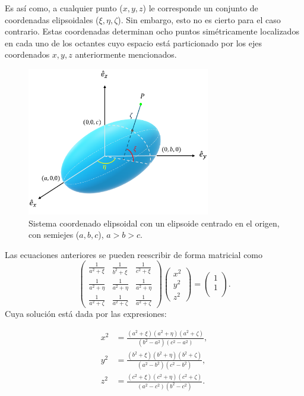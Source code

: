 \noindent Es así como, a cualquier punto ($x,y,z$) le corresponde un conjunto de coordenadas elipsoidales ($\xi,\eta,\zeta$). Sin embargo, esto no es cierto para el caso contrario. Estas coordenadas determinan ocho puntos simétricamente localizados en cada uno de los octantes cuyo espacio está particionado por los ejes coordenados $x,y,z$ anteriormente mencionados.\\
\begin{figure}[H]
    \centering
    \includegraphics[width=8cm]{../../Figuras/elipticalcoordinates}    
    \caption{Sistema coordenado elipsoidal con un elipsoide centrado en el origen, con semiejes ($a, b, c$), $a > b > c.$}
    \label{elipse}
\end{figure}
\noindent Las ecuaciones anteriores se pueden reescribir de forma matricial como
\begin{equation*}
    \begin{pmatrix}
    \frac{1}{a^2+\xi} & \frac{1}{b^2+\xi} & \frac{1}{c^2+\xi}\\
    \frac{1}{a^2+\eta} & \frac{1}{a^2+\eta} & \frac{1}{a^2+\eta}\\
    \frac{1}{a^2+\zeta} & \frac{1}{a^2+\zeta} & \frac{1}{a^2+\zeta}\end{pmatrix}\begin{pmatrix}
        x^2\\
        y^2\\
        z^2
    \end{pmatrix}=\begin{pmatrix}
        1\\
        1\\
    \end{pmatrix}.
\end{equation*}
Cuya solución está dada por las expresiones:

\begin{align}
    x^2&=\frac{(a^2+\xi)(a^2+\eta)(a^2+\zeta)}{(b^2-a^2)(c^2-a^2)},\label{x_elips}\\
     y^2&=\frac{(b^2+\xi)(b^2+\eta)(b^2+\zeta)}{(a^2-b^2)(c^2-b^2)},\label{y_elips}\\
     z^2&=\frac{(c^2+\xi)(c^2+\eta)(c^2+\zeta)}{(a^2-c^2)(b^2-c^2)}. \label{z_elips}    
\end{align}

